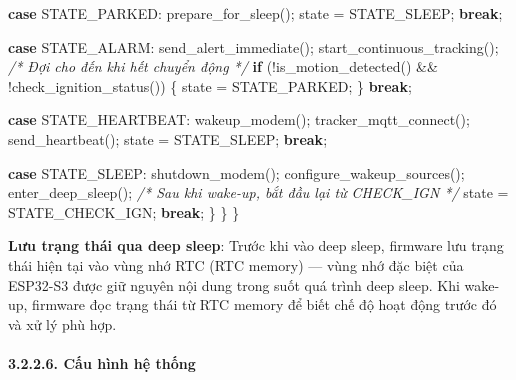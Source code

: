 \documentclass[a4paper]{extarticle}
\newenvironment{Shaded}{}{}
\newcommand{\CommentTok}[1]{\textcolor[rgb]{0.38,0.63,0.69}{\textit{#1}}}
\newcommand{\ControlFlowTok}[1]{\textcolor[rgb]{0.00,0.44,0.13}{\textbf{#1}}}
\newcommand{\NormalTok}[1]{#1}
\newcommand{\OperatorTok}[1]{\textcolor[rgb]{0.40,0.40,0.40}{#1}}
\begin{document}
\begin{Shaded}
\begin{Highlighting}[]
        \ControlFlowTok{case}\NormalTok{ STATE\_PARKED}\OperatorTok{:}
\NormalTok{            prepare\_for\_sleep}\OperatorTok{();}
\NormalTok{            state }\OperatorTok{=}\NormalTok{ STATE\_SLEEP}\OperatorTok{;}
            \ControlFlowTok{break}\OperatorTok{;}

        \ControlFlowTok{case}\NormalTok{ STATE\_ALARM}\OperatorTok{:}
\NormalTok{            send\_alert\_immediate}\OperatorTok{();}
\NormalTok{            start\_continuous\_tracking}\OperatorTok{();}
            \CommentTok{/* Đợi cho đến khi hết chuyển động */}
            \ControlFlowTok{if} \OperatorTok{(!}\NormalTok{is\_motion\_detected}\OperatorTok{()} \OperatorTok{\&\&} \OperatorTok{!}\NormalTok{check\_ignition\_status}\OperatorTok{())} \OperatorTok{\{}
\NormalTok{                state }\OperatorTok{=}\NormalTok{ STATE\_PARKED}\OperatorTok{;}
            \OperatorTok{\}}
            \ControlFlowTok{break}\OperatorTok{;}

        \ControlFlowTok{case}\NormalTok{ STATE\_HEARTBEAT}\OperatorTok{:}
\NormalTok{            wakeup\_modem}\OperatorTok{();}
\NormalTok{            tracker\_mqtt\_connect}\OperatorTok{();}
\NormalTok{            send\_heartbeat}\OperatorTok{();}
\NormalTok{            state }\OperatorTok{=}\NormalTok{ STATE\_SLEEP}\OperatorTok{;}
            \ControlFlowTok{break}\OperatorTok{;}

        \ControlFlowTok{case}\NormalTok{ STATE\_SLEEP}\OperatorTok{:}
\NormalTok{            shutdown\_modem}\OperatorTok{();}
\NormalTok{            configure\_wakeup\_sources}\OperatorTok{();}
\NormalTok{            enter\_deep\_sleep}\OperatorTok{();}
            \CommentTok{/* Sau khi wake{-}up, bắt đầu lại từ CHECK\_IGN */}
\NormalTok{            state }\OperatorTok{=}\NormalTok{ STATE\_CHECK\_IGN}\OperatorTok{;}
            \ControlFlowTok{break}\OperatorTok{;}
        \OperatorTok{\}}
    \OperatorTok{\}}
\OperatorTok{\}}
\end{Highlighting}
\end{Shaded}

\textbf{Lưu trạng thái qua deep sleep}: Trước khi vào deep sleep,
firmware lưu trạng thái hiện tại vào vùng nhớ RTC (RTC memory) --- vùng
nhớ đặc biệt của ESP32-S3 được giữ nguyên nội dung trong suốt quá trình
deep sleep. Khi wake-up, firmware đọc trạng thái từ RTC memory để biết
chế độ hoạt động trước đó và xử lý phù hợp.

\paragraph{3.2.2.6. Cấu hình hệ
thống}\label{3226-cux1ea5u-huxecnh-hux1ec7-thux1ed1ng}
\end{document}
